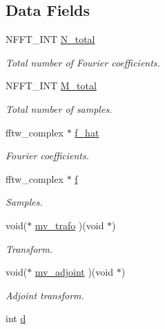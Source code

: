\subsection*{Data Fields}
\begin{DoxyCompactItemize}
\item 
N\-F\-F\-T\-\_\-\-I\-N\-T \hyperlink{structnsfft__plan_aeb21834ddae13a39cc1de3f66cd28e56}{N\-\_\-total}
\begin{DoxyCompactList}\small\item\em Total number of Fourier coefficients. \end{DoxyCompactList}\item 
N\-F\-F\-T\-\_\-\-I\-N\-T \hyperlink{structnsfft__plan_a4037cd83b64fbf025711dd7c78e8543b}{M\-\_\-total}
\begin{DoxyCompactList}\small\item\em Total number of samples. \end{DoxyCompactList}\item 
fftw\-\_\-complex $\ast$ \hyperlink{structnsfft__plan_ae3e2fcefd21caff3aa1e978b522d4ee3}{f\-\_\-hat}
\begin{DoxyCompactList}\small\item\em Fourier coefficients. \end{DoxyCompactList}\item 
fftw\-\_\-complex $\ast$ \hyperlink{structnsfft__plan_a7ffefff1410360f4264e12398db06787}{f}
\begin{DoxyCompactList}\small\item\em Samples. \end{DoxyCompactList}\item 
void($\ast$ \hyperlink{structnsfft__plan_abbab5fc009e68a329bbebee4904e53a5}{mv\-\_\-trafo} )(void $\ast$)
\begin{DoxyCompactList}\small\item\em Transform. \end{DoxyCompactList}\item 
void($\ast$ \hyperlink{structnsfft__plan_a9761ac166f3ec93197e8e409ba78fb4f}{mv\-\_\-adjoint} )(void $\ast$)
\begin{DoxyCompactList}\small\item\em Adjoint transform. \end{DoxyCompactList}\item 
\hypertarget{structnsfft__plan_ac5e6ad608ed1e1d39f17d1512703ddfe}{int \hyperlink{structnsfft__plan_ac5e6ad608ed1e1d39f17d1512703ddfe}{d}}\label{structnsfft__plan_ac5e6ad608ed1e1d39f17d1512703ddfe}


\end{DoxyCompactItemize}
